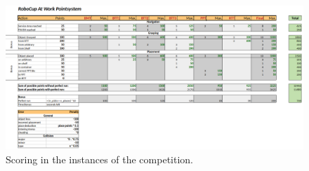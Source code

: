 

\begin{figure}[h!]
	\centering
	\includegraphics[width= 1.1\textwidth, angle =90 ]{./images/tabels/table_points.png}
	\caption{Scoring in the instances of the \RCAW \YEAR competition.}
	\label{fig:test_scoring}
\end{figure}
